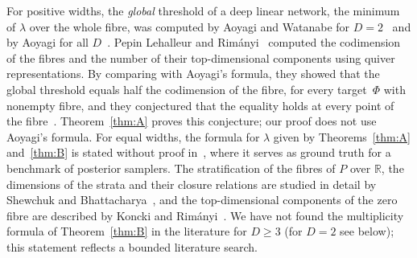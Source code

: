\documentclass[11pt,a4paper]{article}
\theoremstyle{definition}
\theoremstyle{remark}
\numberwithin{equation}{section}
\newcommand{\R}{\mathbb{R}}
\begin{document}
For positive widths, the \emph{global} threshold of a deep linear network, the minimum of $\lambda$ over the whole fibre, was computed by Aoyagi and Watanabe for $D=2$~\cite{aoyagi-watanabe} and by Aoyagi for all $D$~\cite{aoyagi-2024}. Pepin Lehalleur and Rimányi~\cite{lehalleur-rimanyi} computed the codimension of the fibres and the number of their top-dimensional components using quiver representations. By comparing with Aoyagi's formula, they showed that the global threshold equals half the codimension of the fibre, for every target~$\Phi$ with nonempty fibre, and they conjectured that the equality holds at every point of the fibre~\cite[Section~8]{lehalleur-rimanyi}. Theorem~\ref{thm:A} proves this conjecture; our proof does not use Aoyagi's formula. For equal widths, the formula for $\lambda$ given by Theorems~\ref{thm:A} and~\ref{thm:B} is stated without proof in~\cite[Appendix~B, Theorem~B.5]{hitchcock-hoogland}, where it serves as ground truth for a benchmark of posterior samplers. The stratification of the fibres of $P$ over $\R$, the dimensions of the strata and their closure relations are studied in detail by Shewchuk and Bhattacharya~\cite{shewchuk-bhattacharya}, and the top-dimensional components of the zero fibre are described by Koncki and Rimányi~\cite{koncki-rimanyi}. We have not found the multiplicity formula of Theorem~\ref{thm:B} in the literature for $D\ge3$ (for $D=2$ see below); this statement reflects a bounded literature search.
\end{document}
